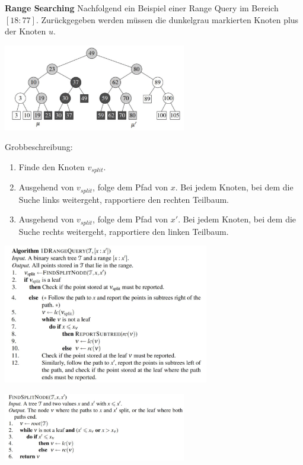 \documentclass[10pt,a4paper,twocolumn]{article}
\begin{document}
\textbf{Range Searching}
Nachfolgend ein Beispiel einer Range Query im Bereich $[18:77]$. Zurückgegeben werden müssen die dunkelgrau markierten Knoten plus der Knoten $u$.
\begin{center}
	\includegraphics[width=8cm]{images/range-search-example}
\end{center}

Grobbeschreibung:
\begin{enumerate}
	\item Finde den Knoten $v_{split}$.
	\item Ausgehend von $v_{split}$, folge dem Pfad von $x$. Bei jedem Knoten, bei dem die Suche links weitergeht, rapportiere den rechten Teilbaum.
	\item Ausgehend von $v_{split}$, folge dem Pfad von $x'$. Bei jedem Knoten, bei dem die Suche rechts weitergeht, rapportiere den linken Teilbaum.
\end{enumerate}

\begin{center}
	\includegraphics[width=9cm]{images/rangequery}
\end{center}


\begin{center}
	\includegraphics[width=8cm]{images/find-split-node}
\end{center}
\end{document}
